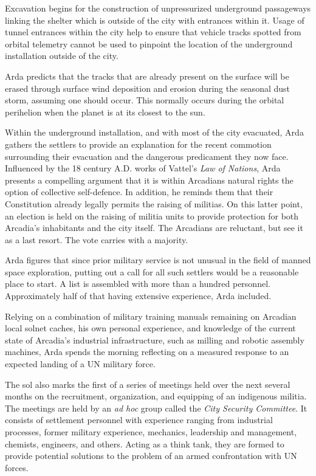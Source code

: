 Excavation begins for the construction of unpressurized underground passageways linking the shelter which is outside of the city with entrances within it. Usage of tunnel entrances within the city help to ensure that vehicle tracks spotted from orbital telemetry cannot be used to pinpoint the location of the underground installation outside of the city. 

Arda predicts that the tracks that are already present on the surface will be erased through surface wind deposition and erosion during the seasonal dust storm, assuming one should occur. This normally occurs during the orbital perihelion when the planet is at its closest to the sun.

Within the underground installation, and with most of the city evacuated, Arda gathers the settlers to provide an explanation for the recent commotion surrounding their evacuation and the dangerous predicament they now face. Influenced by the 18 century A.D. works of Vattel's {\it Law of Nations}, Arda presents a compelling argument that it is within Arcadians natural rights the option of collective self-defence. In addition, he reminds them that their Constitution already legally permits the raising of militias. On this latter point, an election is held on the raising of militia units to provide protection for both Arcadia's inhabitants and the city itself. The Arcadians are reluctant, but see it as a last resort. The vote carries with a majority.

Arda figures that since prior military service is not unusual in the field of manned space exploration, putting out a call for all such settlers would be a reasonable place to start. A list is assembled with more than a hundred personnel. Approximately half of that having extensive experience, Arda included.
\StopTimelineDate

Relying on a combination of military training manuals remaining on Arcadian local solnet caches, his own personal experience, and knowledge of the current state of Arcadia's industrial infrastructure, such as milling and robotic assembly machines, Arda spends the morning reflecting on a measured response to an expected landing of a UN military force. 

The sol also marks the first of a series of meetings held over the next several months on the recruitment, organization, and equipping of an indigenous militia. The meetings are held by an {\it ad hoc} group called the {\it City Security Committee}. It consists of settlement personnel with experience ranging from industrial processes, former military experience, mechanics, leadership and management, chemists, engineers, and others. Acting as a think tank, they are formed to provide potential solutions to the problem of an armed confrontation with UN forces.

